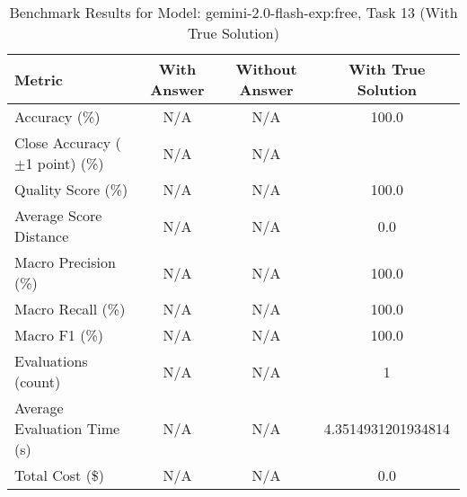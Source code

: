 \begin{table}[htbp]
\centering
\caption{Benchmark Results for Model: gemini-2.0-flash-exp:free, Task 13 (With True Solution)}
\begin{tabular}{lccc}
\toprule
\textbf{Metric} & \textbf{With Answer} & \textbf{Without Answer} & \textbf{With True Solution} \\
\midrule
Accuracy (\%) & N/A & N/A & 100.0 \\
Close Accuracy ($\pm$1 point) (\%) & N/A & N/A \\
Quality Score (\%) & N/A & N/A & 100.0 \\
Average Score Distance & N/A & N/A & 0.0 \\
Macro Precision (\%) & N/A & N/A & 100.0 \\
Macro Recall (\%) & N/A & N/A & 100.0 \\
Macro F1 (\%) & N/A & N/A & 100.0 \\
Evaluations (count) & N/A & N/A & 1 \\
Average Evaluation Time (s) & N/A & N/A & 4.3514931201934814 \\
Total Cost (\$) & N/A & N/A & 0.0 \\
\bottomrule
\end{tabular}
\end{table}